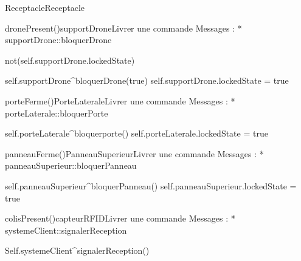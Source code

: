 \begin{OM}{Receptacle}{Receptacle}
\begin{OMOperation}{dronePresent()}{supportDrone}{Livrer une commande}
Messages :
* supportDrone::{bloquerDrone}
\begin{OMPre}
not(self.supportDrone.lockedState)
\end{OMPre}
\begin{OMPost}
        self.supportDrone^bloquerDrone(true)
        self.supportDrone.lockedState = true
    \end{OMPost}
\end{OMOperation}

\begin{OMOperation}{porteFerme()}{PorteLaterale}{Livrer une commande}
Messages :
* porteLaterale::{bloquerPorte}
\begin{OMPre}
\end{OMPre}
\begin{OMPost}
        self.porteLaterale^bloquerporte()
        self.porteLaterale.lockedState = true
    \end{OMPost}
\end{OMOperation}

\begin{OMOperation}{panneauFerme()}{PanneauSuperieur}{Livrer une commande}
Messages :
* panneauSuperieur::{bloquerPanneau}
\begin{OMPre}
\end{OMPre}
\begin{OMPost}
        self.panneauSuperieur^bloquerPanneau()
        self.panneauSuperieur.lockedState = true
    \end{OMPost}
\end{OMOperation}

\begin{OMOperation}{colisPresent()}{capteurRFID}{Livrer une commande}
Messages :
* systemeClient::{signalerReception}
\begin{OMPre}
\end{OMPre}
\begin{OMPost}
        Self.systemeClient^signalerReception()
    \end{OMPost}
\end{OMOperation}
\end{OM}
